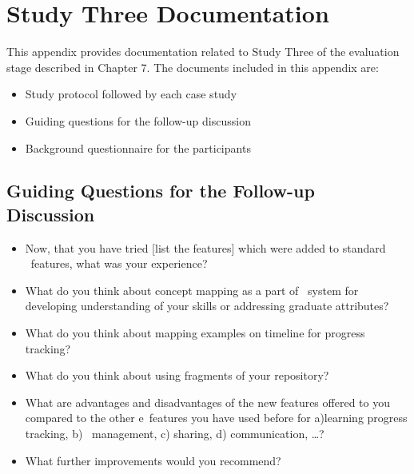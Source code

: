 \chapter{Study Three Documentation \label{cha:app7}}

This appendix provides documentation related to Study Three of the evaluation
stage described in Chapter 7. The documents included in this appendix are:
\begin{itemize}
  \item Study protocol followed by each case study
  \item Guiding questions for the follow-up discussion
  \item Background questionnaire for the participants
\end{itemize}



 
\section{Guiding Questions for the Follow-up Discussion}
\begin{itemize}
  \item Now, that you have tried [list the features] which were added to
  standard \ep~features, what was your experience?
  \item What do you think about concept mapping as a part of \ep~system
  for developing understanding of your skills or addressing graduate attributes?
  \item What do you think about mapping examples on timeline for progress
  tracking?
  \item What do you think about using fragments of your repository?
  \item What are advantages and disadvantages of the new features offered to you
  compared to the other e\ep~features you have used before for a)learning
  progress tracking, b) \ep~management, c) sharing, d) communication, \ldots?
  \item What further improvements would you recommend?
\end{itemize}

